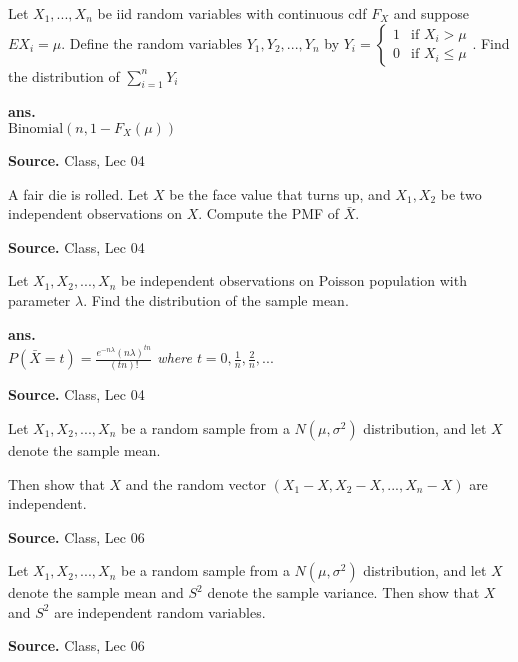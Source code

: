 \documentclass[12pt,twoside]{report}
\newenvironment*{ans}{\textbf{ans.}\space\em\\}{\par}
\newenvironment*{source}{\hfill\scriptsize\textbf{Source.}\space}{\par}
\begin{document}
\begin{samepage}
\begin{ex}
Let $X_1, ..., X_n$ be iid random variables with continuous cdf $F_X$ and suppose $EX_i = \mu$. Define the random variables $Y_1, Y_2, ..., Y_n$ by $Y_i = \begin{cases} 1 & \text{if } X_i > \mu \\ 0 & \text{if } X_i \leq \mu \end{cases}$.
Find the distribution of $\sum_{i=1}^n Y_i$
\end{ex}
\begin{ans}
$\text{Binomial}(n,1-F_X (\mu))$
\end{ans}
\begin{source}
Class, Lec 04
\end{source}
\end{samepage}

\begin{samepage}
\begin{ex}
A fair die is rolled. Let $X$ be the face value that turns up, and $X_1, X_2$ be two independent observations on $X$. Compute the PMF of $\bar{X}$.
\end{ex}
\begin{source}
Class, Lec 04
\end{source}
\end{samepage}

\begin{samepage}
\begin{ex}
Let $X_1, X_2, ..., X_n$ be independent observations on Poisson population with parameter $\lambda$. Find the distribution of the sample mean.
\end{ex}
\begin{ans}
$P(\bar{X} = t) = \displaystyle \frac{e^{-n \lambda} (n \lambda)^{tn}}{(tn)!}$ where $t = 0, \frac{1}{n}, \frac{2}{n}, ...$
\end{ans}
\begin{source}
Class, Lec 04
\end{source}
\end{samepage}

\begin{samepage}
\begin{ex}
Let $X_1, X_2, . . . , X_n$ be a random sample from a $N(\mu, \sigma^2)$ distribution, and let $X$ denote the sample mean.

Then show that $X$ and the random vector $(X_1 - X, X_2 - X, . . . , X_n - X)$ are independent.
\end{ex}
\begin{source}
Class, Lec 06
\end{source}
\end{samepage}

\begin{samepage}
\begin{ex}
Let $X_1, X_2, . . . , X_n$ be a random sample from a $N(\mu, \sigma^2)$ distribution, and let $X$ denote the sample mean and $S^2$ denote the sample variance. Then show that $X$ and $S^2$ are independent random variables.
\end{ex}
\begin{source}
Class, Lec 06
\end{source}
\end{samepage}
\end{document}
